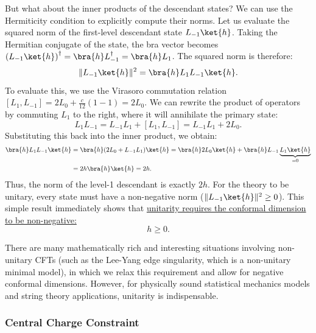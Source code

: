 But what about the inner products of the descendant states? We can use the Hermiticity condition to explicitly compute their norms. Let us evaluate the squared norm of the first-level descendant state \(L_{-1} \ket{h}\). Taking the Hermitian conjugate of the state, the bra vector becomes \(\left(L_{-1}\ket{h}\right)^\dagger = \bra{h}L_{-1}^\dagger = \bra{h}L_1\). The squared norm is therefore:
\[
    \| L_{-1} \ket{h} \|^2 = \bra{h} L_1 L_{-1} \ket{h}.
\]
To evaluate this, we use the Virasoro commutation relation \([L_1, L_{-1}] = 2L_0 + \frac{c}{12}(1-1) = 2L_0\). We can rewrite the product of operators by commuting \(L_1\) to the right, where it will annihilate the primary state:
\[
    L_1 L_{-1} = L_{-1} L_1 + [L_1, L_{-1}] = L_{-1} L_1 + 2L_0.
\]
Substituting this back into the inner product, we obtain:
\[
    \begin{aligned}
        \bra{h} L_1 L_{-1} \ket{h} & = \bra{h} (2 L_0 + L_{-1} L_1) \ket{h} = \bra{h} 2L_0 \ket{h} + \bra{h} L_{-1} \underbrace{L_1 \ket{h}}_{= 0} \\
                                   & = 2h \bra{h}\ket{h} = 2h.
    \end{aligned}
\]
Thus, the norm of the level-1 descendant is exactly \(2h\). For the theory to be unitary, every state must have a non-negative norm (\(\| L_{-1} \ket{h} \|^2 \ge 0\)). This simple result immediately shows that \uline{unitarity requires the conformal dimension to be non-negative:}
\[
    h \ge 0.
\]

\begin{remark}
    There are many mathematically rich and interesting situations involving non-unitary CFTs (such as the Lee-Yang edge singularity, which is a non-unitary minimal model), in which we relax this requirement and allow for negative conformal dimensions. However, for physically sound statistical mechanics models and string theory applications, unitarity is indispensable.
\end{remark}

\subsubsection{Central Charge Constraint}

